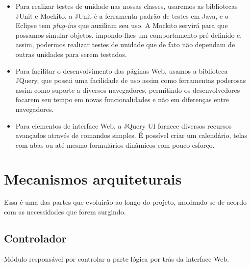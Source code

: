\documentclass[11pt, a4paper]{article}
\begin{document}
\begin{itemize}
            \item Para realizar testes de unidade nas nossas classes, usaremos as
            bibliotecas JUnit e Mockito. a JUnit é a ferramenta padrão de testes em 
			Java, e o Eclipse tem \textit{plug-ins} que auxiliam seu uso. A Mockito
            servirá para que possamos simular objetos, impondo-lhes um comportamento 
			pré-definido e, assim, podermos realizar testes de unidade que de fato 
			não dependam de outras unidades para serem testados.
			
			\item Para facilitar o desenvolvimento das páginas Web, usamos a 
			biblioteca JQuery, que possui uma facilidade de uso assim como ferramentas
			poderosas assim como suporte a diversos navegadores, permitindo os
			desenvolvedores focarem seu tempo em novas funcionalidades e não em
			diferenças entre navegadores.
			
			\item Para elementos de interface Web, a JQuery UI fornece diversos
			recursos avançados através de comandos simples. É possível criar um
			calendário, telas com abas ou até mesmo formulários dinâmicos com
			pouco esforço.
			
        \end{itemize}
    
    \section{Mecanismos arquiteturais}
        Essa é uma das partes que evoluirão ao longo do projeto, moldando-se de
        acordo com as necessidades que forem surgindo.

        \subsection{Controlador}
            Módulo responsável por controlar a parte lógica por trás da
            interface Web.
\end{document}
